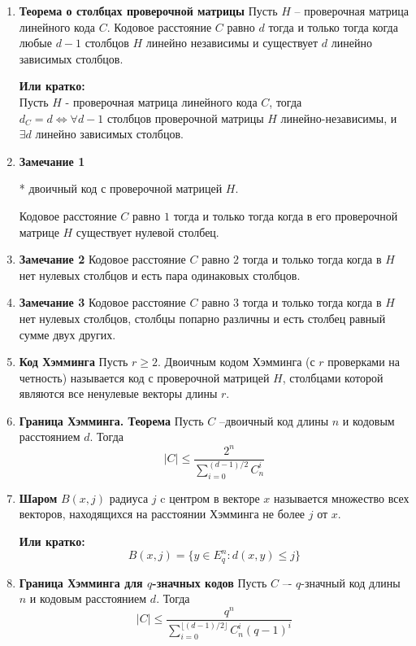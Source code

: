\documentclass[a4paper, 12pt]{report}
\begin{document}
\begin{enumerate}


\item \textbf{Теорема о столбцах проверочной матрицы}
Пусть $H$ – проверочная матрица линейного кода $C$. Кодовое
расстояние $C$ равно $d$ тогда и только тогда когда любые $d - 1$
столбцов $H$ линейно независимы и существует $d$ линейно
зависимых столбцов.

\textbf{Или кратко:}\\
Пусть $H$ - проверочная матрица линейного кода $C$, тогда\\
$d_{C} = d \Leftrightarrow \forall d-1$ столбцов проверочной матрицы $H$ линейно-независимы, и $\exists d$ линейно зависимых столбцов.


\item \textbf{Замечание 1}

* двоичный код с проверочной матрицей $H$.

Кодовое расстояние $C$ равно $1$ тогда и только тогда когда в
его проверочной матрице $H$ существует нулевой столбец.

\item \textbf{Замечание 2}
Кодовое расстояние $C$ равно $2$ тогда и только тогда когда в
$H$ нет нулевых столбцов и есть пара одинаковых столбцов.

\item \textbf{Замечание 3}
Кодовое расстояние $C$ равно $3$ тогда и только тогда когда в
$H$ нет нулевых столбцов, столбцы попарно различны и есть
столбец равный сумме двух других.

\item \textbf{Код Хэмминга}
Пусть $r \geq 2$. Двоичным кодом Хэмминга (с $r$ проверками на
четность) называется код с проверочной матрицей $H$,
столбцами которой являются все ненулевые векторы длины $r$.

\item \textbf{Граница Хэмминга. Теорема}
Пусть $C$ –двоичный код длины $n$ и кодовым расстоянием $d$.
Тогда
\[  |C| \leq \frac {2^n} {{\sum_{i = 0}^{(d - 1)/2} C_n^i}} \]


\item \textbf{Шаром }  $B(x, j)$ радиуса $j$ c центром в векторе $x$ называется
множество всех векторов, находящихся на расстоянии
Хэмминга не более $j$ от $x$.

\textbf{Или кратко:}\\
\[B(x,j) = \lbrace y\in E_{q}^{n} : d(x,y) \leq j\rbrace\]

\item \textbf{Граница Хэмминга для $q$-значных кодов}
Пусть $C$ –- $q$-значный код длины $n$ и кодовым расстоянием $d$.
Тогда
\[  |C| \leq \frac {q^n} {{\sum_{i = 0}^{\lfloor(d - 1)/2\rfloor} C_n^i (q - 1)^i}} \]


\end{enumerate}
\end{document}
